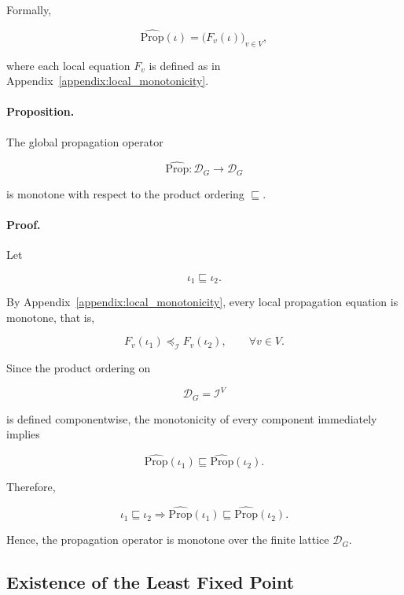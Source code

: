 \documentclass[10pt]{article}
\begin{document}
Formally,

\begin{equation}
	\label{eq:global_operator}
	\widehat{\mathrm{Prop}}(\iota)
	=
	\bigl(
	F_v(\iota)
	\bigr)_{v\in V},
\end{equation}

where each local equation $F_v$ is defined as in
Appendix~\ref{appendix:local_monotonicity}.

\paragraph{Proposition.}
The global propagation operator

\[
\widehat{\mathrm{Prop}}
:
\mathcal D_G
\rightarrow
\mathcal D_G
\]

is monotone with respect to the product ordering
$\sqsubseteq$.

\paragraph{Proof.}

Let

\[
\iota_1
\sqsubseteq
\iota_2.
\]

By Appendix~\ref{appendix:local_monotonicity}, every local propagation equation
is monotone, that is,

\[
F_v(\iota_1)
\preceq_{\mathcal I}
F_v(\iota_2),
\qquad
\forall v\in V.
\]

Since the product ordering on

\[
\mathcal D_G
=
\mathcal I^{V}
\]

is defined componentwise, the monotonicity of every component immediately
implies

\[
\widehat{\mathrm{Prop}}(\iota_1)
\sqsubseteq
\widehat{\mathrm{Prop}}(\iota_2).
\]

Therefore,

\begin{equation}
	\label{eq:global_monotonicity}
	\iota_1
	\sqsubseteq
	\iota_2
	\Longrightarrow
	\widehat{\mathrm{Prop}}(\iota_1)
	\sqsubseteq
	\widehat{\mathrm{Prop}}(\iota_2).
\end{equation}

Hence, the propagation operator is monotone over the finite lattice
$\mathcal D_G$.

\subsection{Existence of the Least Fixed Point}
\end{document}
